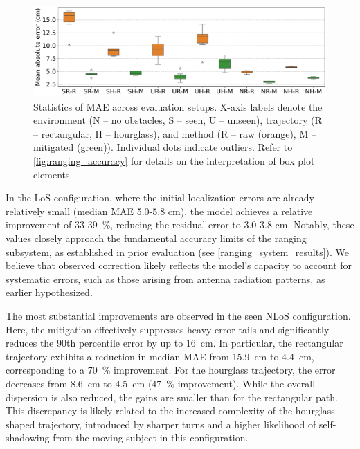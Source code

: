 \begin{figure}[tbh]
    \centering
    \includegraphics[width=\textwidth]{Figures/experiments_and_results/dtw_errors_mae_box.pdf}
    \caption[Statistics of mean absolute error across all evaluation setups.]{Statistics of MAE across evaluation setups. X-axis labels denote the environment (N -- no obstacles, S -- seen, U -- unseen), trajectory (R -- rectangular, H -- hourglass), and method (R -- raw (orange), M -- mitigated (green)). Individual dots indicate outliers. Refer to \autoref{fig:ranging_accuracy} for details on the interpretation of box plot elements.}
    \label{fig:dtw_errors_mae_box}
\end{figure}

In the LoS configuration, where the initial localization errors are already relatively small (median MAE 5.0-5.8 \si{\centi\meter}), the model achieves a relative improvement of 33-39~\si{\percent}, reducing the residual error to 3.0-3.8 \si{\centi\meter}. Notably, these values closely approach the fundamental accuracy limits of the ranging subsystem, as established in prior evaluation (see \autoref{ranging_system_results}). We believe that observed correction likely reflects the model’s capacity to account for systematic errors, such as those arising from antenna radiation patterns, as earlier hypothesized.

The most substantial improvements are observed in the seen NLoS configuration. Here, the mitigation effectively suppresses heavy error tails and significantly reduces the 90th percentile error by up to \SI{16}{\centi\metre}. In particular, the rectangular trajectory exhibits a reduction in median MAE from \SI{15.9}{\centi\metre} to \SI{4.4}{\centi\metre}, corresponding to a \SI{70}{\percent} improvement. For the hourglass trajectory, the error decreases from \SI{8.6}{\centi\metre} to \SI{4.5}{\centi\metre} (\SI{47}{\percent} improvement). While the overall dispersion is also reduced, the gains are smaller than for the rectangular path. This discrepancy is likely related to the increased complexity of the hourglass-shaped trajectory, introduced by sharper turns and a higher likelihood of self-shadowing from the moving subject in this configuration.

